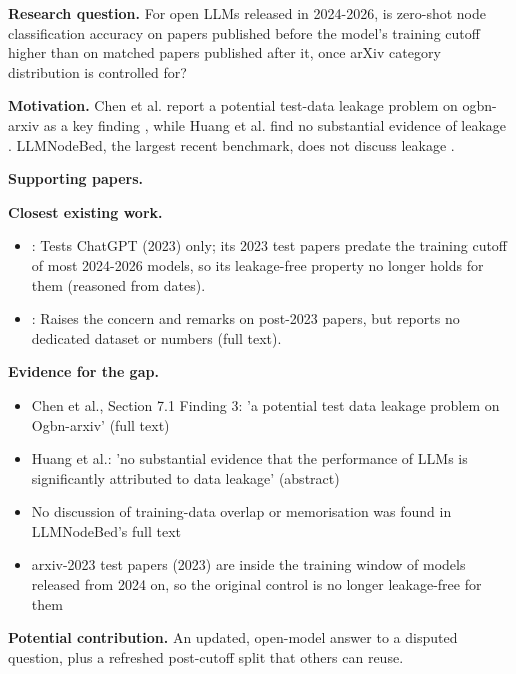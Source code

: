 \documentclass[11pt,a4paper]{article}
\begin{document}
\textbf{Research question.} For open LLMs released in 2024-2026, is zero-shot node classification accuracy on papers published before the model's training cutoff higher than on matched papers published after it, once arXiv category distribution is controlled for?

\textbf{Motivation.} Chen et al. report a potential test-data leakage problem on ogbn-arxiv as a key finding \cite{chen2024exploring}, while Huang et al. find no substantial evidence of leakage \cite{huang2023leakage}. LLMNodeBed, the largest recent benchmark, does not discuss leakage \cite{wu2025llmnodebed}.

\textbf{Supporting papers.} \cite{chen2024exploring,huang2023leakage,wu2025llmnodebed}

\textbf{Closest existing work.}
\begin{itemize}
\item \cite{huang2023leakage}: Tests ChatGPT (2023) only; its 2023 test papers predate the training cutoff of most 2024-2026 models, so its leakage-free property no longer holds for them (reasoned from dates).
\item \cite{chen2024exploring}: Raises the concern and remarks on post-2023 papers, but reports no dedicated dataset or numbers (full text).
\end{itemize}

\textbf{Evidence for the gap.}
\begin{itemize}
\item [V] Chen et al., Section 7.1 Finding 3: 'a potential test data leakage problem on Ogbn-arxiv' (full text) \cite{chen2024exploring}
\item [V] Huang et al.: 'no substantial evidence that the performance of LLMs is significantly attributed to data leakage' (abstract) \cite{huang2023leakage}
\item [V] No discussion of training-data overlap or memorisation was found in LLMNodeBed's full text \cite{wu2025llmnodebed}
\item [E] arxiv-2023 test papers (2023) are inside the training window of models released from 2024 on, so the original control is no longer leakage-free for them
\end{itemize}

\textbf{Potential contribution.} An updated, open-model answer to a disputed question, plus a refreshed post-cutoff split that others can reuse.
\end{document}
